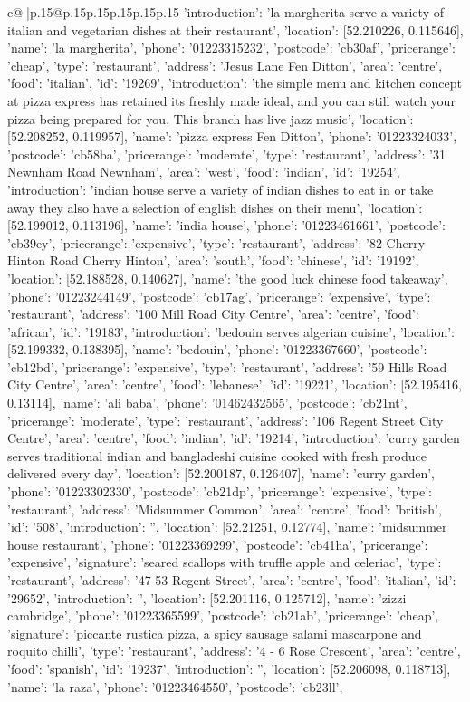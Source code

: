 \documentclass{article}
\begin{document}
{\begin{supertabular}{c@{$\;$}|p{.15\linewidth}@{}p{.15\linewidth}p{.15\linewidth}p{.15\linewidth}p{.15\linewidth}p{.15\linewidth}}
{{{'introduction': 'la margherita serve a variety of italian and vegetarian dishes at their restaurant', 'location': [52.210226, 0.115646], 'name': 'la margherita', 'phone': '01223315232', 'postcode': 'cb30af', 'pricerange': 'cheap', 'type': 'restaurant'}, {'address': 'Jesus Lane Fen Ditton', 'area': 'centre', 'food': 'italian', 'id': '19269', 'introduction': 'the simple menu and kitchen concept at pizza express has retained its freshly made ideal, and you can still watch your pizza being prepared for you. This branch has live jazz music', 'location': [52.208252, 0.119957], 'name': 'pizza express Fen Ditton', 'phone': '01223324033', 'postcode': 'cb58ba', 'pricerange': 'moderate', 'type': 'restaurant'}, {'address': '31 Newnham Road Newnham', 'area': 'west', 'food': 'indian', 'id': '19254', 'introduction': 'indian house serve a variety of indian dishes to eat in or take away they also have a selection of english dishes on their menu', 'location': [52.199012, 0.113196], 'name': 'india house', 'phone': '01223461661', 'postcode': 'cb39ey', 'pricerange': 'expensive', 'type': 'restaurant'}, {'address': '82 Cherry Hinton Road Cherry Hinton', 'area': 'south', 'food': 'chinese', 'id': '19192', 'location': [52.188528, 0.140627], 'name': 'the good luck chinese food takeaway', 'phone': '01223244149', 'postcode': 'cb17ag', 'pricerange': 'expensive', 'type': 'restaurant'}, {'address': '100 Mill Road City Centre', 'area': 'centre', 'food': 'african', 'id': '19183', 'introduction': 'bedouin serves algerian cuisine', 'location': [52.199332, 0.138395], 'name': 'bedouin', 'phone': '01223367660', 'postcode': 'cb12bd', 'pricerange': 'expensive', 'type': 'restaurant'}, {'address': '59 Hills Road City Centre', 'area': 'centre', 'food': 'lebanese', 'id': '19221', 'location': [52.195416, 0.13114], 'name': 'ali baba', 'phone': '01462432565', 'postcode': 'cb21nt', 'pricerange': 'moderate', 'type': 'restaurant'}, {'address': '106 Regent Street City Centre', 'area': 'centre', 'food': 'indian', 'id': '19214', 'introduction': 'curry garden serves traditional indian and bangladeshi cuisine cooked with fresh produce delivered every day', 'location': [52.200187, 0.126407], 'name': 'curry garden', 'phone': '01223302330', 'postcode': 'cb21dp', 'pricerange': 'expensive', 'type': 'restaurant'}, {'address': 'Midsummer Common', 'area': 'centre', 'food': 'british', 'id': '508', 'introduction': '', 'location': [52.21251, 0.12774], 'name': 'midsummer house restaurant', 'phone': '01223369299', 'postcode': 'cb41ha', 'pricerange': 'expensive', 'signature': 'seared scallops with truffle apple and celeriac', 'type': 'restaurant'}, {'address': '47-53 Regent Street', 'area': 'centre', 'food': 'italian', 'id': '29652', 'introduction': '', 'location': [52.201116, 0.125712], 'name': 'zizzi cambridge', 'phone': '01223365599', 'postcode': 'cb21ab', 'pricerange': 'cheap', 'signature': 'piccante rustica pizza, a spicy sausage salami mascarpone and roquito chilli', 'type': 'restaurant'}, {'address': '4 - 6 Rose Crescent', 'area': 'centre', 'food': 'spanish', 'id': '19237', 'introduction': '', 'location': [52.206098, 0.118713], 'name': 'la raza', 'phone': '01223464550', 'postcode': 'cb23ll', }}}
\end{supertabular}}
\end{document}
